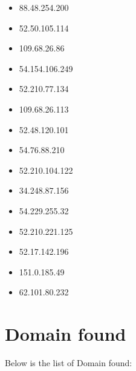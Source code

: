 \documentclass{article}
\begin{document}
\begin{itemize}
        \item 88.48.254.200
    
        \item 52.50.105.114
    
        \item 109.68.26.86
    
        \item 54.154.106.249
    
        \item 52.210.77.134
    
        \item 109.68.26.113
    
        \item 52.48.120.101
    
        \item 54.76.88.210
    
        \item 52.210.104.122
    
        \item 34.248.87.156
    
        \item 54.229.255.32
    
        \item 52.210.221.125
    
        \item 52.17.142.196
    
        \item 151.0.185.49
    
        \item 62.101.80.232
    
\end{itemize}


\section*{Domain found}

Below is the list of Domain found:
\end{document}
